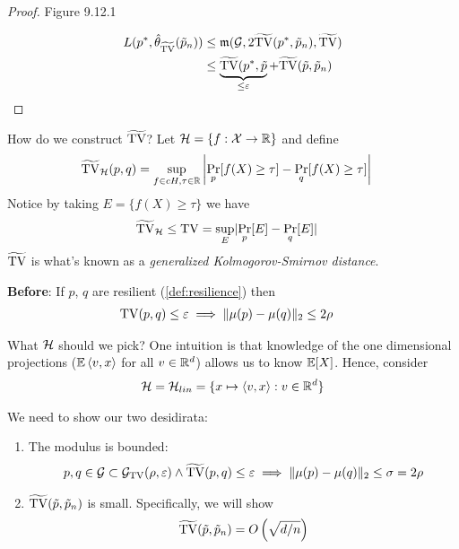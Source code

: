 \begin{proof}
    Figure 9.12.1
    
    \begin{align}
        L(p^*, \hat{\theta}_{\widetilde{\operatorname{TV}}}(\tilde{p}_n))
        &\leq \mathfrak{m}(\mathcal{G}, 2 \widetilde{\operatorname{TV}}(p^*, \tilde{p}_n), \widetilde{\operatorname{TV}}) \\
        &\leq \underbrace{\widetilde{\operatorname{TV}}(p^*, \tilde{p}}_{\leq \varepsilon} + \widetilde{\operatorname{TV}}(\tilde{p}, \tilde{p}_n)
    \end{align}
\end{proof}

How do we construct $\widetilde{\operatorname{TV}}$? Let $\mathcal{H} = \{ f : \mathcal{X} \to \mathbb{R} \}$ and define
\begin{align}
    \widetilde{\operatorname{TV}}_{\mathcal{H}}(p, q) &= \sup_{f \in cH, \tau \in \mathbb{R}}
        \left\lvert \Pr_p[f(X) \geq \tau] - \Pr_q[f(X) \geq \tau] \right\rvert
\end{align}
Notice by taking $E = \{f(X) \geq \tau\}$ we have
\begin{align}
    \widetilde{\operatorname{TV}}_{\mathcal{H}} &\leq \operatorname{TV} = \sup_E \lvert \Pr_p[E] - \Pr_q[E] \rvert
\end{align}
$\widetilde{\operatorname{TV}}$ is what's known as a \emph{generalized Kolmogorov-Smirnov distance}.

\textbf{Before}: If $p$, $q$ are resilient (\cref{def:resilience}) then
\begin{align}
    \operatorname{TV}(p, q) \leq \varepsilon &\implies \|\mu(p) - \mu(q)\|_2 \leq 2 \rho
\end{align}

What $\mathcal{H}$ should we pick? One intuition is that knowledge of the 
one dimensional projections ($\mathbb{E}\braket{v,x}$ for all $v \in \mathbb{R}^d$) 
allows us to know $\mathbb{E}[X]$. Hence, consider
\begin{align}
    \mathcal{H} = \mathcal{H}_{lin} = \{ x \mapsto \braket{v, x} : v \in \mathbb{R}^d \}
\end{align}

We need to show our two desidirata:
\begin{enumerate}
    \item The modulus is bounded:
    \begin{align}
        p,q \in \mathcal{G} \subset \mathcal{G}_{\operatorname{TV}}(\rho, \varepsilon) \land \widetilde{\operatorname{TV}}(p,q) \leq \varepsilon
        \implies \|\mu(p) - \mu(q)\|_2 \leq \sigma = 2 \rho\label{eq:9-12-desidirata-1}
    \end{align}
    \item $\widetilde{\operatorname{TV}}(\tilde{p}, \tilde{p}_n)$ is small. Specifically,
    we will show
    \begin{align}
        \widetilde{\operatorname{TV}}(\tilde{p}, \tilde{p}_n) = O\left(\sqrt{d/n}\right)\label{eq:9-12-desidirata-2}
    \end{align}
\end{enumerate}

